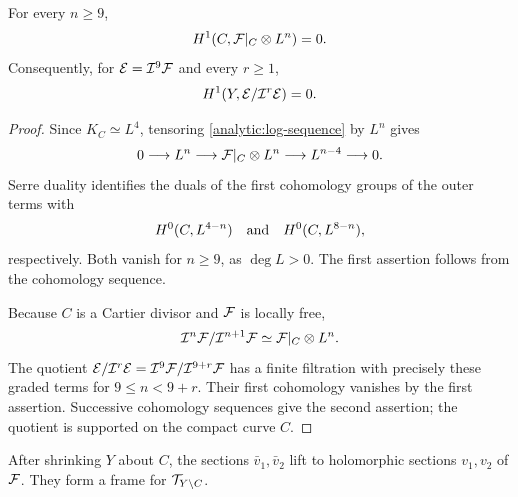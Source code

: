 \begin{lemma}\label{analytic:graded-vanishing}
For every $n\geq9$,
\[
 H^1(C,\mathcal F|_C\otimes L^n)=0.
\]
Consequently, for $\mathcal E=\mathcal I^9\mathcal F$ and every $r\geq1$,
\[
 H^1(Y,\mathcal E/\mathcal I^r\mathcal E)=0.
\]
\end{lemma}

\begin{proof}
Since $K_C\simeq L^4$, tensoring
\eqref{analytic:log-sequence} by $L^n$ gives
\[
 0\longrightarrow L^n\longrightarrow\mathcal F|_C\otimes L^n
 \longrightarrow L^{n-4}\longrightarrow0.
\]
Serre duality identifies the duals of the first cohomology groups of
the outer terms with
\[
 H^0(C,L^{4-n})\quad\hbox{and}\quad H^0(C,L^{8-n}),
\]
respectively.  Both vanish for $n\geq9$, as $\deg L>0$.
The first assertion follows from the cohomology sequence.

Because $C$ is a Cartier divisor and $\mathcal F$ is locally free,
\[
 \mathcal I^n\mathcal F/\mathcal I^{n+1}\mathcal F\simeq\mathcal F|_C\otimes L^n.
\]
The quotient
$\mathcal E/\mathcal I^r\mathcal E=\mathcal I^9\mathcal F/\mathcal I^{9+r}\mathcal F$
has a finite filtration with precisely these graded terms for
$9\leq n<9+r$.  Their first cohomology vanishes by the first
assertion.  Successive cohomology sequences give the second
assertion; the quotient is supported on the compact curve $C$.
\end{proof}

\begin{lemma}\label{analytic:actual-lifting}
After shrinking $Y$ about $C$, the sections $\bar v_1,\bar v_2$ lift
to holomorphic sections $v_1,v_2$ of $\mathcal F$.  They form a frame for
$\mathcal T_{Y\setminus C}$.
\end{lemma}

